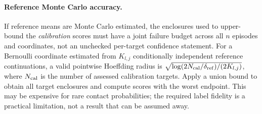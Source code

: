 \documentclass[10pt]{article}
\begin{document}
\paragraph{Reference Monte Carlo accuracy.}
If reference means are Monte Carlo estimated, the enclosures used to upper-bound the \emph{calibration} scores must have a joint failure budget across all $n$ episodes and coordinates, not an unchecked per-target confidence statement. For a Bernoulli coordinate estimated from $K_{l,j}$ conditionally independent reference continuations, a valid pointwise Hoeffding radius is $\sqrt{\log(2N_{\rm cal}/\delta_{\rm ref})/(2K_{l,j})}$, where $N_{\rm cal}$ is the number of assessed calibration targets. Apply a union bound to obtain all target enclosures and compute scores with the worst endpoint. This may be expensive for rare contact probabilities; the required label fidelity is a practical limitation, not a result that can be assumed away.
\end{document}
